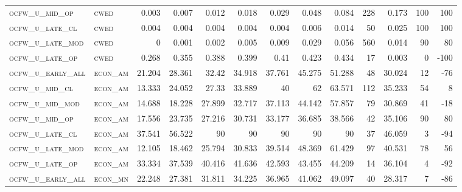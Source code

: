 \begin{landscape}
\begin{center}
\begin{footnotesize}
\begin{longtable}{llrrrrrrrr|rrr}
\textsc{ocfw\_u\_mid\_op   } & \textsc{cwed      }   & 0.003    & 0.007    & 0.012    & 0.018    & 0.029    & 0.048    & 0.084     & 228    & 0.173         & 100           & 100             \\
\textsc{ocfw\_u\_late\_cl  } & \textsc{cwed      }   & 0.004    & 0.004    & 0.004    & 0.004    & 0.004    & 0.006    & 0.014     & 50     & 0.025         & 100           & 100             \\
\textsc{ocfw\_u\_late\_mod } & \textsc{cwed      }   & 0        & 0.001    & 0.002    & 0.005    & 0.009    & 0.029    & 0.056     & 560    & 0.014         & 90            & 80              \\
\textsc{ocfw\_u\_late\_op  } & \textsc{cwed      }   & 0.268    & 0.355    & 0.388    & 0.399    & 0.41     & 0.423    & 0.434     & 17     & 0.003         & 0             & -100            \\
\textsc{ocfw\_u\_early\_all} & \textsc{econ\_am  }   & 21.204   & 28.361   & 32.42    & 34.918   & 37.761   & 45.275   & 51.288    & 48     & 30.024        & 12            & -76             \\
\textsc{ocfw\_u\_mid\_cl   } & \textsc{econ\_am  }   & 13.333   & 24.052   & 27.33    & 33.889   & 40       & 62       & 63.571    & 112    & 35.233        & 54            & 8               \\
\textsc{ocfw\_u\_mid\_mod  } & \textsc{econ\_am  }   & 14.688   & 18.228   & 27.899   & 32.717   & 37.113   & 44.142   & 57.857    & 79     & 30.869        & 41            & -18             \\
\textsc{ocfw\_u\_mid\_op   } & \textsc{econ\_am  }   & 17.556   & 23.735   & 27.216   & 30.731   & 33.177   & 36.685   & 38.566    & 42     & 35.106        & 90            & 80              \\
\textsc{ocfw\_u\_late\_cl  } & \textsc{econ\_am  }   & 37.541   & 56.522   & 90       & 90       & 90       & 90       & 90        & 37     & 46.059        & 3             & -94             \\
\textsc{ocfw\_u\_late\_mod } & \textsc{econ\_am  }   & 12.105   & 18.462   & 25.794   & 30.833   & 39.514   & 48.369   & 61.429    & 97     & 40.531        & 78            & 56              \\
\textsc{ocfw\_u\_late\_op  } & \textsc{econ\_am  }   & 33.334   & 37.539   & 40.416   & 41.636   & 42.593   & 43.455   & 44.209    & 14     & 36.104        & 4             & -92             \\
\textsc{ocfw\_u\_early\_all} & \textsc{econ\_mn  }   & 22.248   & 27.381   & 31.811   & 34.225   & 36.965   & 41.062   & 49.097    & 40     & 28.317        & 7             & -86             \\

\end{longtable}
\end{footnotesize}
\end{center}
\end{landscape}
